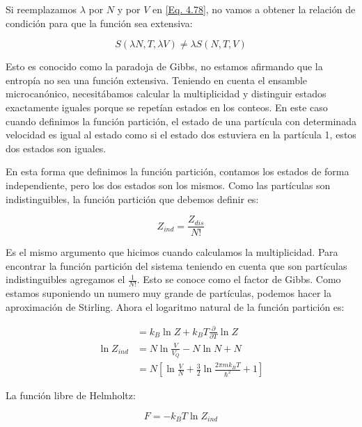 \documentclass[11pt,fleqn]{book}
\begin{document}
Si reemplazamos $\lambda$ por $N$ y por $V$ en \ref{Eq. 4.78}, no vamos a obtener la relación de condición para que la función sea extensiva:

\begin{equation}
    S(\lambda N, T, \lambda V)\neq\lambda S(N, T, V)
    \label{Eq. 4.80}
\end{equation}

Esto es conocido como la paradoja de Gibbs, no estamos afirmando que la entropía no sea una función extensiva. Teniendo en cuenta el ensamble microcanónico, necesitábamos calcular la multiplicidad y distinguir estados exactamente iguales porque se repetían estados en los conteos. En este caso cuando definimos la función partición, el estado de una partícula con determinada velocidad es igual al estado como si el estado dos estuviera en la partícula 1, estos dos estados son iguales.


En esta forma que definimos la función partición, contamos los estados de forma independiente, pero los dos estados son los mismos. Como las partículas son indistinguibles, la función partición que debemos definir es:

\begin{equation}
    Z_{ind}=\frac{Z_{dis}}{N!}
    \label{Eq. 4.81}
\end{equation}

Es el mismo argumento que hicimos cuando calculamos la multiplicidad. Para encontrar la función partición del sistema teniendo en cuenta que son partículas indistinguibles agregamos el $\frac{1}{N!}$. Esto se conoce como el factor de Gibbs. Como estamos suponiendo un numero muy grande de partículas, podemos hacer la aproximación de Stirling. Ahora el logaritmo natural de la función partición es:

\begin{equation} 
\begin{split}
&=k_{B}\ln{Z}+k_{B}T\frac{\partial}{\partial T}\ln{Z}\\
    \ln{Z_{ind}}&=N\ln{\frac{V}{V_{Q}}}- N\ln{N}+N\\
    &=N\left[\ln{\frac{V}{N}}+\frac{3}{2}\ln{\frac{2\pi mk_{B}T}{\hslash^{2}}}+1\right]
      \end{split}  
    \label{Eq. 4.82}
\end{equation}

La función libre de Helmholtz:

\begin{equation}
    F=-k_{B}T\ln{Z_{ind}}
        \label{Eq. 4.83}
\end{equation}
\end{document}

